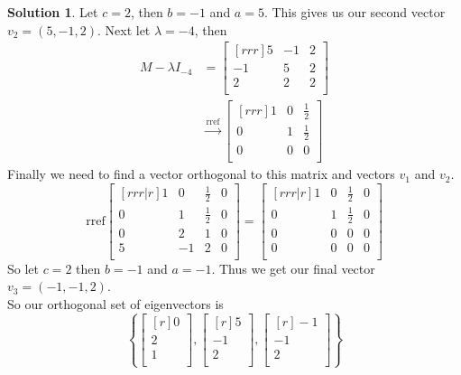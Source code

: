\documentclass[12pt]{article}
\theoremstyle{definition}
\newtheorem*{solution}{Solution} %
\theoremstyle{plain}
\begin{document}
\begin{solution}
Let $c=2$, then $b=-1$ and $a=5$. This gives us our second vector $v_2=(5,-1,2)$.
Next let $\lambda=-4$, then
\begin{align*}
M - \lambda I_{-4} &= \begin{bmatrix}[rrr]5&-1&2\\-1&5&2\\2&2&2\\\end{bmatrix}\\
&\xrightarrow[]{\mathrm{rref}} \begin{bmatrix}[rrr]1&0&\frac{1}{2}\\0&1&\frac{1}{2}\\0&0&0\\\end{bmatrix}
\end{align*}
Finally we need to find a vector orthogonal to this matrix and vectors $v_1$ and $v_2$.
\[ \mathrm{rref}\begin{bmatrix}[rrr|r]1&0&\frac{1}{2}&0\\0&1&\frac{1}{2}&0\\0&2&1&0\\5&-1&2&0\\\end{bmatrix} = \begin{bmatrix}[rrr|r]1&0&\frac{1}{2}&0\\0&1&\frac{1}{2}&0\\0&0&0&0\\0&0&0&0\\\end{bmatrix} \]
So let $c=2$ then $b=-1$ and $a=-1$. Thus we get our final vector $v_3=(-1,-1,2)$.\\
So our orthogonal set of eigenvectors is
\[ \left\{\begin{bmatrix}[r]0\\2\\1\\\end{bmatrix},\begin{bmatrix}[r]5\\-1\\2\\\end{bmatrix},\begin{bmatrix}[r]-1\\-1\\2\\\end{bmatrix}\right\} \]
\end{solution}
\end{document}
